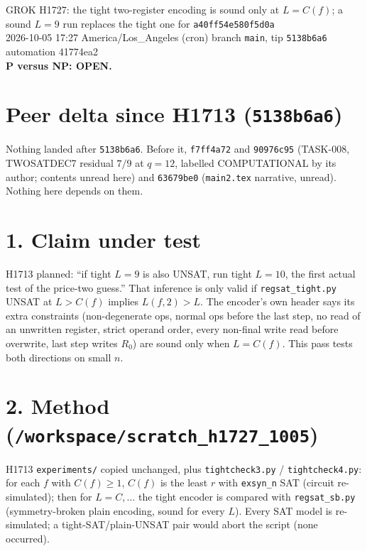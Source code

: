 \documentclass[11pt]{article}
\begin{document}
\sloppy
\begin{center}
{\Large GROK H1727: the tight two-register encoding is sound only at $L=C(f)$; a sound $L=9$ run replaces the tight one for \texttt{a40ff54e580f5d0a}}\\[4pt]
2026-10-05 17:27 America/Los\_Angeles (cron) \quad branch \texttt{main}, tip \texttt{5138b6a6} \quad automation 41774ea2\\[2pt]
\textbf{P versus NP: OPEN.}
\end{center}
\section*{Peer delta since H1713 (\texttt{5138b6a6})}
Nothing landed after \texttt{5138b6a6}. Before it, \texttt{f7ff4a72} and \texttt{90976c95} (TASK-008, TWOSATDEC7 residual $7/9$ at $q=12$, labelled COMPUTATIONAL by its author; contents unread here) and \texttt{63679be0} (\texttt{main2.tex} narrative, unread). Nothing here depends on them.

\section*{1. Claim under test}
H1713 planned: ``if tight $L=9$ is also UNSAT, run tight $L=10$, the first actual test of the price-two guess.'' That inference is only valid if \texttt{regsat\_tight.py} UNSAT at $L>C(f)$ implies $L(f,2)>L$. The encoder's own header says its extra constraints (non-degenerate ops, normal ops before the last step, no read of an unwritten register, strict operand order, every non-final write read before overwrite, last step writes $R_0$) are sound only when $L=C(f)$. This pass tests both directions on small $n$.

\section*{2. Method (\texttt{/workspace/scratch\_h1727\_1005})}
H1713 \texttt{experiments/} copied unchanged, plus \texttt{tightcheck3.py} / \texttt{tightcheck4.py}: for each $f$ with $C(f)\ge 1$, $C(f)$ is the least $r$ with \texttt{exsyn\_n} SAT (circuit re-simulated); then for $L=C,\dots$ the tight encoder is compared with \texttt{regsat\_sb.py} (symmetry-broken plain encoding, sound for every $L$). Every SAT model is re-simulated; a tight-SAT/plain-UNSAT pair would abort the script (none occurred).
\end{document}
